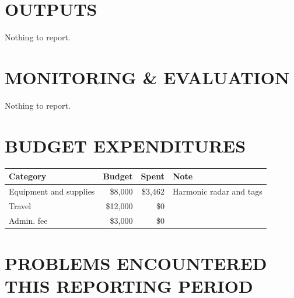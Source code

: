 \documentclass[12pt,letterpaper,english,bibliography=totocnumbered,abstract=on]{scrartcl}
\begin{document}
\section{OUTPUTS} 

%
%
%
%
%
%

Nothing to report.

\section{MONITORING \& EVALUATION}

%

Nothing to report.

\section{BUDGET EXPENDITURES}


\begin{tabular}{lrrl}
	\hline
	Category & Budget & Spent & Note \\
	\hline 
	Equipment and supplies & \$8,000 & \$3,462 & Harmonic radar and tags \\ 
	Travel & \$12,000 & \$0 \\ 
	Admin. fee & \$3,000 & \$0 \\ 
	\hline 
\end{tabular} 

\section{PROBLEMS ENCOUNTERED THIS REPORTING PERIOD}
\label{impediments}
\end{document}
